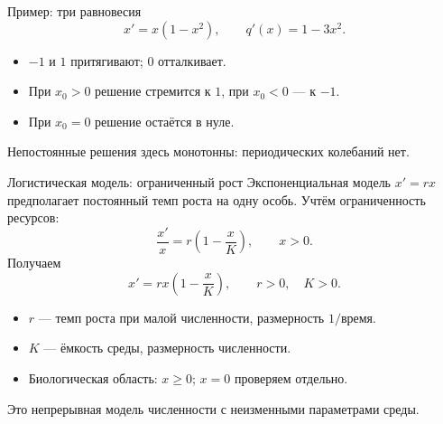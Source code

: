 \documentclass[aspectratio=169,11pt]{beamer}
\begin{document}
\begin{frame}{Пример: три равновесия}
\[
x'=x(1-x^2),\qquad q'(x)=1-3x^2.
\]
\begin{center}
\end{center}
\begin{itemize}
\item $-1$ и $1$ притягивают; $0$ отталкивает.
\item При $x_0>0$ решение стремится к $1$, при $x_0<0$ --- к $-1$.
\item При $x_0=0$ решение остаётся в нуле.
\end{itemize}
Непостоянные решения здесь монотонны: периодических колебаний нет.
\end{frame}

\begin{frame}{Логистическая модель: ограниченный рост}
Экспоненциальная модель $x'=rx$ предполагает постоянный
темп роста на одну особь. Учтём ограниченность ресурсов:
\[
\frac{x'}x=r\left(1-\frac{x}{K}\right),\qquad x>0.
\]
Получаем
\[
\boxed{x'=rx\left(1-\frac{x}{K}\right)},\qquad r>0,\quad K>0.
\]
\begin{itemize}
\item $r$ --- темп роста при малой численности, размерность $1/\text{время}$.
\item $K$ --- ёмкость среды, размерность численности.
\item Биологическая область: $x\ge0$; $x=0$ проверяем отдельно.
\end{itemize}
Это непрерывная модель численности с неизменными параметрами среды.
\end{frame}
\end{document}
